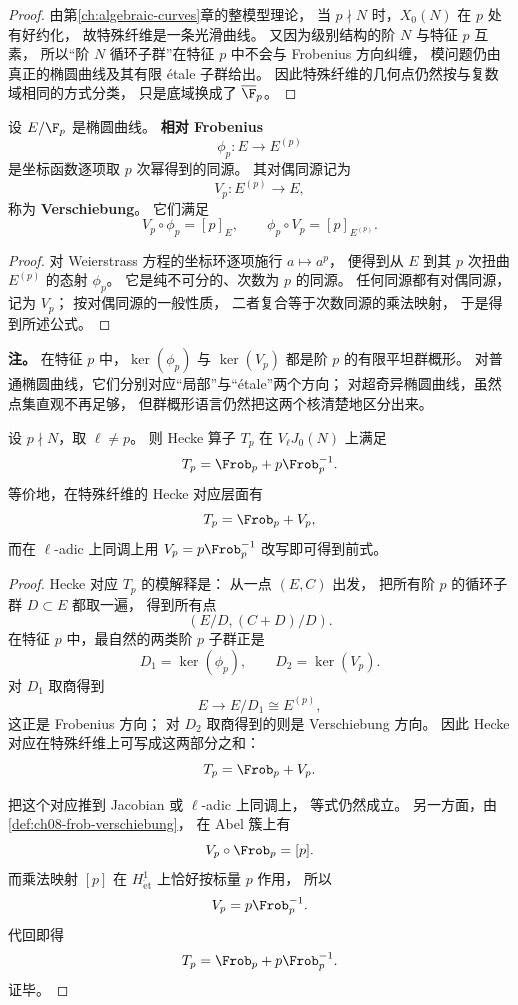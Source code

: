 \begin{proof}
由第\ref{ch:algebraic-curves}章的整模型理论，
当 $p\nmid N$ 时，$X_0(N)$ 在 $p$ 处有好约化，
故特殊纤维是一条光滑曲线。
又因为级别结构的阶 $N$ 与特征 $p$ 互素，
所以“阶 $N$ 循环子群”在特征 $p$ 中不会与 Frobenius 方向纠缠，
模问题仍由真正的椭圆曲线及其有限 étale 子群给出。
因此特殊纤维的几何点仍然按与复数域相同的方式分类，
只是底域换成了 $\overline{\F}_p$。
\end{proof}

\begin{definition}
\label{def:ch08-frob-verschiebung}
设 $E/\F_p$ 是椭圆曲线。
\textbf{相对 Frobenius}
\[
  \phi_p\colon E\longrightarrow E^{(p)}
\]
是坐标函数逐项取 $p$ 次幂得到的同源。
其对偶同源记为
\[
  V_p\colon E^{(p)}\longrightarrow E,
\]
称为 \textbf{Verschiebung}。
它们满足
\[
  V_p\circ \phi_p=[p]_{E},
  \qquad
  \phi_p\circ V_p=[p]_{E^{(p)}}.
\]
\end{definition}

\begin{proof}
对 Weierstrass 方程的坐标环逐项施行 $a\mapsto a^p$，
便得到从 $E$ 到其 $p$ 次扭曲 $E^{(p)}$ 的态射 $\phi_p$。
它是纯不可分的、次数为 $p$ 的同源。
任何同源都有对偶同源，记为 $V_p$；
按对偶同源的一般性质，
二者复合等于次数同源的乘法映射，
于是得到所述公式。
\end{proof}

\textbf{注。}
在特征 $p$ 中，$\ker(\phi_p)$ 与 $\ker(V_p)$ 都是阶 $p$ 的有限平坦群概形。
对普通椭圆曲线，它们分别对应“局部”与“étale”两个方向；
对超奇异椭圆曲线，虽然点集直观不再足够，
但群概形语言仍然把这两个核清楚地区分出来。

\begin{theorem}
\label{thm:ch08-modp-es}
设 $p\nmid N$，取 $\ell\neq p$。
则 Hecke 算子 $T_p$ 在 $V_\ell J_0(N)$ 上满足
\[
  T_p=\Frob_p+p\Frob_p^{-1}.
\]
等价地，在特殊纤维的 Hecke 对应层面有
\[
  T_p=\Frob_p+V_p,
\]
而在 $\ell$-adic 上同调上用 $V_p=p\Frob_p^{-1}$ 改写即可得到前式。
\end{theorem}

\begin{proof}
Hecke 对应 $T_p$ 的模解释是：
从一点 $(E,C)$ 出发，
把所有阶 $p$ 的循环子群 $D\subset E$ 都取一遍，
得到所有点
\[
  (E/D,(C+D)/D).
\]
在特征 $p$ 中，最自然的两类阶 $p$ 子群正是
\[
  D_1=\ker(\phi_p),
  \qquad
  D_2=\ker(V_p).
\]
对 $D_1$ 取商得到
\[
  E\longrightarrow E/D_1\cong E^{(p)},
\]
这正是 Frobenius 方向；
对 $D_2$ 取商得到的则是 Verschiebung 方向。
因此 Hecke 对应在特殊纤维上可写成这两部分之和：
\[
  T_p=\Frob_p+V_p.
\]

把这个对应推到 Jacobian 或 $\ell$-adic 上同调上，
等式仍然成立。
另一方面，由 \cref{def:ch08-frob-verschiebung}，
在 Abel 簇上有
\[
  V_p\circ \Frob_p=[p].
\]
而乘法映射 $[p]$ 在 $H^1_{\mathrm{\acute et}}$ 上恰好按标量 $p$ 作用，
所以
\[
  V_p=p\Frob_p^{-1}.
\]
代回即得
\[
  T_p=\Frob_p+p\Frob_p^{-1}.
\]
证毕。
\end{proof}

